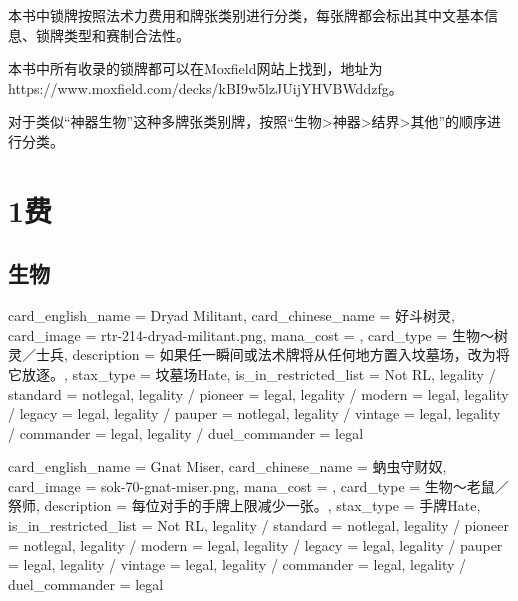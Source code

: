 \documentclass[lang = cn, color = black, 10pt]{AllThatStax}
\begin{document}
本书中锁牌按照法术力费用和牌张类别进行分类，每张牌都会标出其中文基本信息、锁牌类型和赛制合法性。

本书中所有收录的锁牌都可以在Moxfield网站上找到，地址为https://www.moxfield.com/decks/kBI9w5lzJUijYHVBWddzfg。

对于类似“神器生物”这种多牌张类别牌，按照“生物>神器>结界>其他”的顺序进行分类。

\tableofcontents

\mainmatter


\chapter{1费}

\section{生物}

\card
{
	card_english_name = {Dryad Militant},
	card_chinese_name = {好斗树灵},
	card_image = rtr-214-dryad-militant.png,
	mana_cost = ,
	card_type = 生物～树灵／士兵,
	description = {如果任一瞬间或法术牌将从任何地方置入坟墓场，改为将它放逐。},
	stax_type = 坟墓场Hate,
	is_in_restricted_list = Not RL,
	legality / standard = notlegal,
	legality / pioneer = legal,
	legality / modern = legal,
	legality / legacy = legal,
	legality / pauper = notlegal,
	legality / vintage = legal,
	legality / commander = legal,
	legality / duel_commander = legal
}

\card
{
	card_english_name = {Gnat Miser},
	card_chinese_name = {蚋虫守财奴},
	card_image = sok-70-gnat-miser.png,
	mana_cost = ,
	card_type = 生物～老鼠／祭师,
	description = {每位对手的手牌上限减少一张。},
	stax_type = 手牌Hate,
	is_in_restricted_list = Not RL,
	legality / standard = notlegal,
	legality / pioneer = notlegal,
	legality / modern = legal,
	legality / legacy = legal,
	legality / pauper = legal,
	legality / vintage = legal,
	legality / commander = legal,
	legality / duel_commander = legal
}
\end{document}
